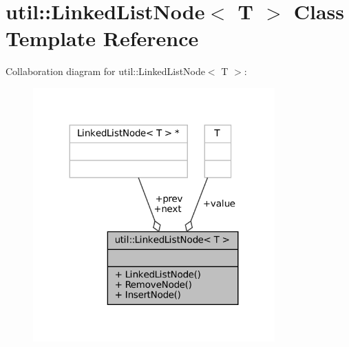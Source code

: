 \hypertarget{classutil_1_1LinkedListNode}{}\section{util\+:\+:Linked\+List\+Node$<$ T $>$ Class Template Reference}
\label{classutil_1_1LinkedListNode}


Collaboration diagram for util\+:\+:Linked\+List\+Node$<$ T $>$\+:
\nopagebreak
\begin{figure}[H]
\begin{center}
\leavevmode
\includegraphics[width=263pt]{classutil_1_1LinkedListNode__coll__graph}
\end{center}
\end{figure}
